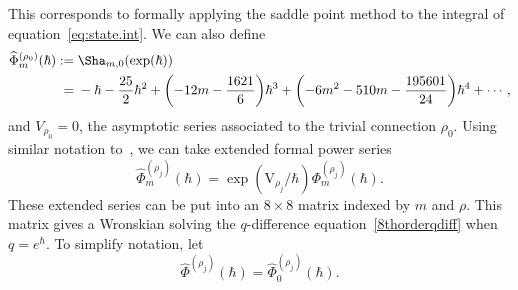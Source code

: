 \documentclass[pdftex]{sigma}
\numberwithin{equation}{section}
\def\VC{\mathrm{VC}}
\def\WRT{\Sha}
\def\VC{\mathrm{V}}
\begin{document}
This corresponds to formally applying the saddle point method to the integral of equation~\eqref{eq:state.int}. We can also define
\begin{align*}
 \widehat{\Phi}^{(\rho_0)}_{m}(\hbar) :={}& \WRT_{m,0}(\exp(\hbar))\\
  ={}&
 -\hbar - \frac{25}{2}\hbar^2 + \biggl(-12m - \frac{1621}{6}\biggr)\hbar^3 + \biggl(-6m^2 - 510m - \frac{195601}{24}\biggr)\hbar^4+\cdots ,
\end{align*}
and $V_{\rho_0}=0$, the asymptotic series associated to the trivial connection $\rho_0$. Using similar notation to~\cite{GZ:RQMOD}, we can take extended formal power series
\[
 \widehat{\Phi}^{(\rho_{j})}_{m}(\hbar)=\exp(\VC_{\rho_{j}}/\hbar)\Phi^{(\rho_{j})}_{m}(\hbar) .
\]
These extended series can be put into an $8\times 8$ matrix indexed by $m$ and $\rho$. This matrix gives a Wronskian solving the $q$-difference equation~\eqref{8thorderqdiff} when $q=e^{\hbar}$. To simplify notation, let
\[
\widehat{\Phi}^{(\rho_{j})}(\hbar)=\widehat{\Phi}^{(\rho_{j})}_{0}(\hbar).
\]
\end{document}
